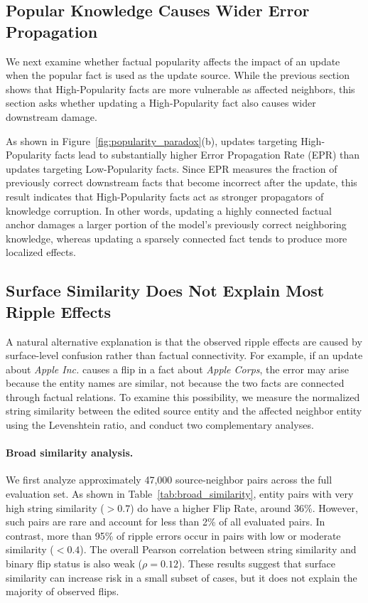 \subsection{Popular Knowledge Causes Wider Error Propagation}
\label{subsec:popular_propagation}

We next examine whether factual popularity affects the impact of an update when the popular fact is used as the update source. While the previous section shows that High-Popularity facts are more vulnerable as affected neighbors, this section asks whether updating a High-Popularity fact also causes wider downstream damage.

As shown in Figure~\ref{fig:popularity_paradox}(b), updates targeting High-Popularity facts lead to substantially higher Error Propagation Rate (EPR) than updates targeting Low-Popularity facts. Since EPR measures the fraction of previously correct downstream facts that become incorrect after the update, this result indicates that High-Popularity facts act as stronger propagators of knowledge corruption. In other words, updating a highly connected factual anchor damages a larger portion of the model's previously correct neighboring knowledge, whereas updating a sparsely connected fact tends to produce more localized effects.

\subsection{Surface Similarity Does Not Explain Most Ripple Effects}
\label{subsec:semantic_control}

A natural alternative explanation is that the observed ripple effects are caused by surface-level confusion rather than factual connectivity. For example, if an update about \textit{Apple Inc.} causes a flip in a fact about \textit{Apple Corps}, the error may arise because the entity names are similar, not because the two facts are connected through factual relations. To examine this possibility, we measure the normalized string similarity between the edited source entity and the affected neighbor entity using the Levenshtein ratio, and conduct two complementary analyses.

\paragraph{Broad similarity analysis.}
We first analyze approximately 47,000 source-neighbor pairs across the full evaluation set. As shown in Table~\ref{tab:broad_similarity}, entity pairs with very high string similarity ($>0.7$) do have a higher Flip Rate, around 36\%. However, such pairs are rare and account for less than 2\% of all evaluated pairs. In contrast, more than 95\% of ripple errors occur in pairs with low or moderate similarity ($<0.4$). The overall Pearson correlation between string similarity and binary flip status is also weak ($\rho=0.12$). These results suggest that surface similarity can increase risk in a small subset of cases, but it does not explain the majority of observed flips.

